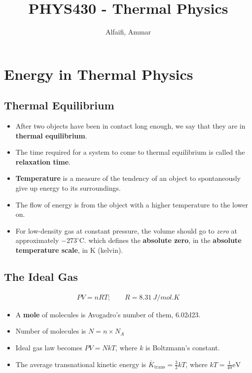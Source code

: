 \documentclass{book}
\title{PHYS430 - Thermal Physics}
\author{Alfaifi, Ammar}
\date{}
\begin{document}
\maketitle

\chapter{Energy in Thermal Physics}


\section{Thermal Equilibrium}%
\label{sec:thermal-equilibrium}

\begin{itemize}
	\item After two objects have been in contact long enough, we say that they are in \textbf{thermal equilibrium}.
	\item The time required for a system to come to thermal equilibrium is called the \textbf{relaxation time}.
	\item \textbf{Temperature} is a measure of the tendency of an object to spontaneously give up energy to its
	      surroundings.
	\item The flow of energy is from the object with a higher temperature to the lower on.
	\item For low-density gas at constant pressure, the volume should go to \textit{zero} at
	      approximately $-273^{\circ}$C. which defines the \textbf{absolute zero}, in the
	      \textbf{absolute temperature scale}, in K (kelvin).
\end{itemize}

\section{The Ideal Gas}%
\label{sec:The Ideal Gas}
\begin{align}
	PV = nRT; \qquad R = \qty{8.31}{J / mol . K}
\end{align}

\begin{itemize}
	\item A \textbf{mole} of molecules is Avogadro's number of them, \num{6.02d23}.
	\item Number of molecules is $N=n \times N_{A}$
	\item Ideal gas law becomes $PV = NkT$, where $k$ is Boltzmann's constant.
	\item The average transnational kinetic energy is $\bar{K}_{\text{trans}}= \frac{3}{2}kT$,
	      where $kT = \frac{1}{40} \si{\electronvolt}$
\end{itemize}
\end{document}
